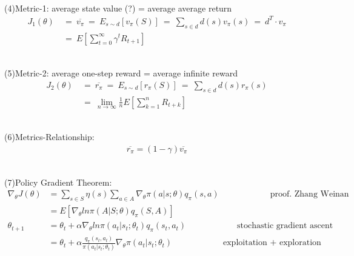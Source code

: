 \documentclass{article}
\begin{document}
~ \\[3pt]
(4)Metric-1: average state value (?) = average average return 
\begin{align*}
    J_{1} (\theta) & \ = \ \overline{v_{\pi}} 
                     \ = \ E_{s \sim d} [ v_{\pi}(S) ] 
                     \ = \ \sum_{s \in d} d(s) v_{\pi}(s) 
                     \ = \ d^{T} \cdot v_{\pi} \\[3pt]
                   & \ = \ E \left[ \sum_{t = 0}^{\infty} 
                                    \gamma^{t} R_{t+1} \right] 
\end{align*}

~ \\[3pt]
(5)Metric-2: average one-step reward = average infinite reward 
\begin{align*}
    J_{2} (\theta) & \ = \ \overline{r_{\pi}} 
                     \ = \ E_{s \sim d} [ r_{\pi}(S) ] 
                     \ = \ \sum_{s \in d} d(s) r_{\pi}(s) \\[3pt]
                   & \ = \ \lim_{n \to \infty} \frac{1}{n} 
                     E \left[ \sum_{k = 1}^{n} R_{t+k} \right] 
\end{align*}

~ \\[3pt]
(6)Metrics-Relationship: 
\begin{align*}
    \overline{r_{\pi}} = (1 - \gamma) \overline{v_{\pi}} 
\end{align*}

~ \\[3pt]
(7)Policy Gradient Theorem: 
\begin{align*}
    \nabla_{\theta} J(\theta) &= \sum_{s \in S} \eta (s) 
    \sum_{a \in A} \nabla_{\theta} \pi (a | s; \theta) q_{\pi} (s, a) 
    \qquad \qquad \qquad \text{proof. Zhang Weinan} \\[3pt]
    &= E \left[ \nabla_{\theta} ln \pi (A | S; \theta) q_{\pi} (S, A) \right] \\[3pt]
    \theta_{t+1} &= \theta_{t} + \alpha \nabla_{\theta} 
                    ln \pi (a_{t} | s_{t}; \theta_{t}) q_{\pi} (s_{t}, a_{t}) 
                    \qquad \qquad \qquad \text{stochastic gradient ascent} \\[3pt]
                 &= \theta_{t} + \alpha 
                 \frac{q_{\pi} (s_{t}, a_{t})}{\pi (a_{t} | s_{t}; \theta_{t})} 
                 \nabla_{\theta} \pi (a_{t} | s_{t}; \theta_{t}) 
                 \qquad \qquad \qquad \text{exploitation + exploration} 
\end{align*}
\end{document}
